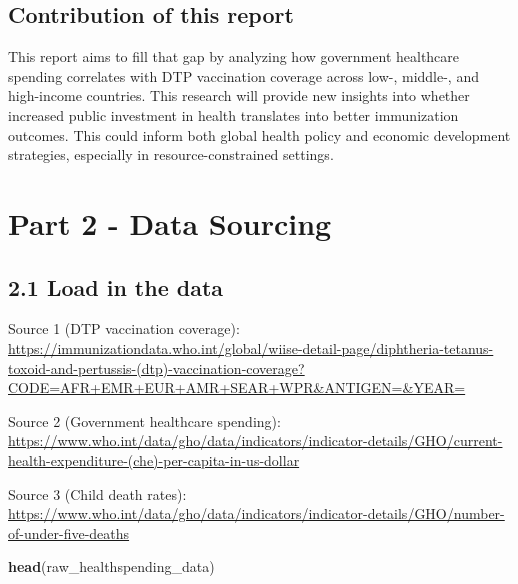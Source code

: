 \documentclass[
]{article}
\newenvironment{Shaded}{\begin{snugshade}}{\end{snugshade}}
\newcommand{\FunctionTok}[1]{\textcolor[rgb]{0.13,0.29,0.53}{\textbf{#1}}}
\newcommand{\NormalTok}[1]{#1}
\begin{document}
\subsection{Contribution of this
report}\label{contribution-of-this-report}

This report aims to fill that gap by analyzing how government healthcare
spending correlates with DTP vaccination coverage across low-, middle-,
and high-income countries. This research will provide new insights into
whether increased public investment in health translates into better
immunization outcomes. This could inform both global health policy and
economic development strategies, especially in resource-constrained
settings.

\section{Part 2 - Data Sourcing}\label{part-2---data-sourcing}

\subsection{2.1 Load in the data}\label{load-in-the-data}

Source 1 (DTP vaccination coverage):
\url{https://immunizationdata.who.int/global/wiise-detail-page/diphtheria-tetanus-toxoid-and-pertussis-(dtp)-vaccination-coverage?CODE=AFR+EMR+EUR+AMR+SEAR+WPR&ANTIGEN=&YEAR=}

Source 2 (Government healthcare spending):
\url{https://www.who.int/data/gho/data/indicators/indicator-details/GHO/current-health-expenditure-(che)-per-capita-in-us-dollar}

Source 3 (Child death rates):
\url{https://www.who.int/data/gho/data/indicators/indicator-details/GHO/number-of-under-five-deaths}

\begin{Shaded}
\begin{Highlighting}[]
\FunctionTok{head}\NormalTok{(raw\_healthspending\_data)}
\end{Highlighting}
\end{Shaded}
\end{document}
